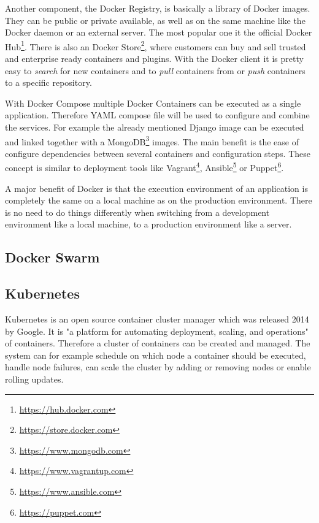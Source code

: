 Another component, the Docker Registry, is basically a library of Docker images.
They can be public or private available, as well as on the same machine like the Docker daemon or an external server.\cite[cf.]{dockerEngine}
The most popular one it the official Docker Hub\footnote{\url{https://hub.docker.com}}.
There is also an Docker Store\footnote{\url{https://store.docker.com}}, where customers can buy and sell trusted and enterprise ready containers and plugins.
With the Docker client it is pretty easy to \textit{search} for new containers and to \textit{pull} containers from or \textit{push} containers to a specific repository.

With Docker Compose multiple Docker Containers can be executed as a single application.
Therefore YAML compose file will be used to configure and combine the services.
For example the already mentioned Django image can be executed and linked together with a MongoDB\footnote{\url{https://www.mongodb.com}} images.
The main benefit is the ease of configure dependencies between several containers and configuration steps.
These concept is similar to deployment tools like Vagrant\footnote{\url{https://www.vagrantup.com}}, Ansible\footnote{\url{https://www.ansible.com}} or Puppet\footnote{\url{https://puppet.com}}.

A major benefit of Docker is that the execution environment of an application is completely the same on a local machine as on the production environment.\cite[cf.][p. 2]{Gallagher:2015}
There is no need to do things differently when switching from a development environment like a local machine, to a production environment like a server.\cite[cf.][p. 2]{Gallagher:2015}

\subsection{Docker Swarm}
\doit

\subsection{Kubernetes}
Kubernetes is an open source container cluster manager which was released 2014 by Google.
It is "a platform for automating deployment, scaling, and operations"\cite[p. 1]{Grant:2015} of containers.
Therefore a cluster of containers can be created and managed.
The system can for example schedule on which node a container should be executed, handle node failures, can scale the cluster by adding or removing nodes or enable rolling updates.\cite[p. 5 f.]{Grant:2015}

